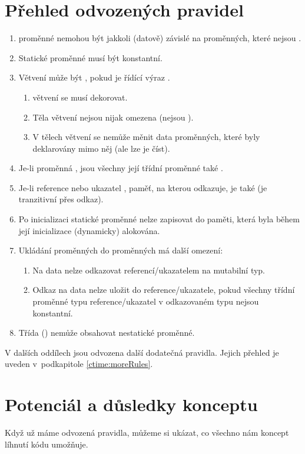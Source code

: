 \section{Přehled odvozených pravidel} \label{ctime:rules}
\begin{enumerate}
	\item \ctime proměnné nemohou být jakkoli (datově) závislé na proměnných, které nejsou \ctime. 
	\item Statické \ctime proměnné musí být konstantní.
	\item Větvení může být \ctime, pokud je řídící výraz \ctime.
	\begin{enumerate}
		\item \ctime větvení se musí dekorovat.
		\item Těla \ctime větvení nejsou nijak omezena (nejsou \ctime).
		\item V tělech \nonctime větvení se nemůže měnit data \ctime proměnných, které byly deklarovány mimo něj (ale lze je číst).
	\end{enumerate}
	\item Je-li proměnná \ctime, jsou všechny její třídní proměnné také \ctime.
	\item Je-li reference nebo ukazatel \ctime, paměť, na kterou odkazuje, je také \ctime (\ctime je tranzitivní přes odkaz).
	\item Po inicializaci statické \ctime proměnné nelze zapisovat do paměti, která byla během její inicializace (dynamicky) alokována.
	\item Ukládání \ctime proměnných do \nonctime proměnných má další omezení:
	\begin{enumerate}
		\item Na \ctime data nelze odkazovat \nonctime referencí/ukazatelem na mutabilní typ.
		\item Odkaz na \ctime data nelze uložit do \nonctime reference/ukazatele, pokud všechny třídní proměnné typu reference/ukazatel v odkazovaném typu nejsou konstantní.
	\end{enumerate}
	\item Třída (\nonctime) nemůže obsahovat nestatické \ctime proměnné.
\end{enumerate}

V dalších oddílech jsou odvozena další dodatečná pravidla. Jejich přehled je uveden v~podkapitole \ref{ctime:moreRules}.

\section{Potenciál a důsledky konceptu}
Když už máme odvozená pravidla, můžeme si ukázat, co všechno nám koncept líhnutí kódu umožňuje.

